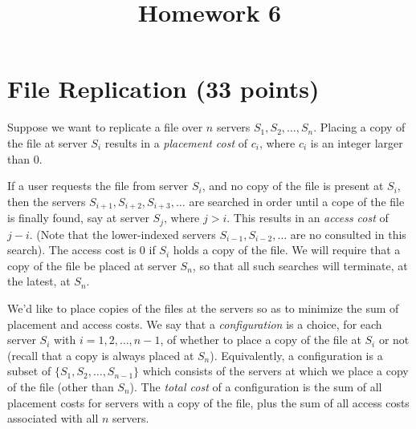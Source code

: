 \documentclass{article}
\begin{document}
\title{Homework 6}
\maketitle
\thispagestyle{fancy}

\section{File Replication (33 points)}

Suppose we want to replicate a file over $n$ servers $S_1, S_2, \dots, S_n$.  Placing a copy of the file at server $S_i$ results in a \emph{placement cost} of $c_i$, where $c_i$ is an integer larger than $0$.  

If a user requests the file from server $S_i$, and no copy of the file is present at $S_i$, then the servers $S_{i+1}, S_{i+2}, S_{i+3}, \dots$ are searched in order until a cope of the file is finally found, say at server $S_j$, where $j > i$.  This results in an \emph{access cost} of $j-i$.  (Note that the lower-indexed servers $S_{i-1}, S_{i-2}, \dots$ are no consulted in this search).  The access cost is $0$ if $S_i$ holds a copy of the file.  We will require that a copy of the file be placed at server $S_n$, so that all such searches will terminate, at the latest, at $S_n$.  

We'd like to place copies of the files at the servers so as to minimize the sum of placement and access costs.  We say that a \emph{configuration} is a choice, for each server $S_i$ with $i=1,2,\dots, n-1$, of whether to place a copy of the file at $S_i$ or not (recall that a copy is always placed at $S_n$).  Equivalently, a configuration is a subset of $\{S_1, S_2, \dots, S_{n-1}\}$ which consists of the servers at which we place a copy of the file (other than $S_n$).  The \emph{total cost} of a configuration is the sum of all placement costs for servers with a copy of the file, plus the sum of all access costs associated with all $n$ servers.  
\end{document}
